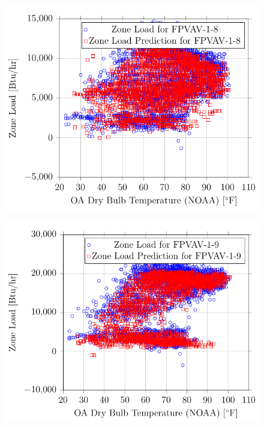 \begin{figure}
\centering
\includegraphics[]{Plots/23/2017-06-27-1346-BtuhrvsOADryBulbTemperatureNOAAF.pdf}
\caption{}
\label{fig:2017-06-27-1346-BtuhrvsOADryBulbTemperatureNOAAF}
\end{figure}

\begin{figure}
\centering
\includegraphics[]{Plots/24/2017-06-27-1348-BtuhrvsOADryBulbTemperatureNOAAF.pdf}
\caption{}
\label{fig:2017-06-27-1348-BtuhrvsOADryBulbTemperatureNOAAF}
\end{figure}

